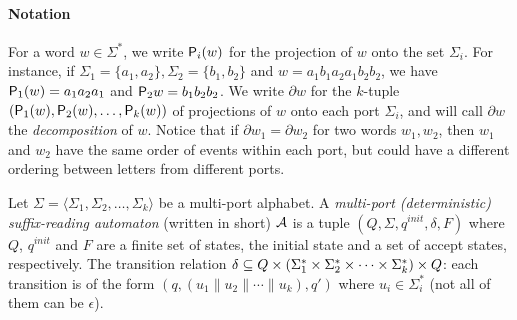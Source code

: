 \paragraph*{Notation} For a word $w \in \Sigma^*$, we write
$\mathsf{P}_{i}(w)$ for the projection of $w$ onto the set $\Sigma_i$. For
instance, if $\Sigma_1 = \{a_1, a_2\}, \Sigma_2 = \{b_1, b_2\}$ and
$w = a_1 b_1 a_2 a_1 b_2 b_2$, we have $\mathsf{P}_{1}(w) = a_1 a_2 a_1$ and
$\mathsf{P}_{2}{w} = b_1 b_2 b_2$.  We write $\partial w$ for the $k$-tuple
$(\mathsf{P}_{1}(w), \mathsf{P}_{2}(w), \dots, \mathsf{P}_{k}(w))$ of projections of $w$
onto each port $\Sigma_i$, and will call $\partial w$ the
\emph{decomposition} of $w$. Notice that if
$\partial w_1 = \partial w_2$ for two words $w_1, w_2$, then $w_1$ and
$w_2$ have the same order of events within each port, but could have a
different ordering between letters from different ports.%


\begin{definition} Let
 $\Sigma = \langle \Sigma_1, \Sigma_2, \dots, \Sigma_k \rangle$ be a
 multi-port alphabet. A \emph{multi-port (deterministic)
   suffix-reading automaton} (written \mdsa in short) $\mathcal{A}$ is a
 tuple $(Q, \Sigma, q^{init}, \delta, F)$ where $Q$, $q^{init}$ and
 $F$ are a finite set of states, the initial state and a set of
 accept states, respectively. The transition relation
 $\delta \subseteq Q \times (\Sigma_1^* \times \Sigma_2^* \times \cdots
 \times \Sigma_k^*) \times Q$: each transition is of the form
 $(q, (u_1 \parallel u_2 \parallel \cdots \parallel u_k), q')$ where
 $u_i \in \Sigma_i^*$ (not all of them can be $\epsilon$).
\end{definition}%


